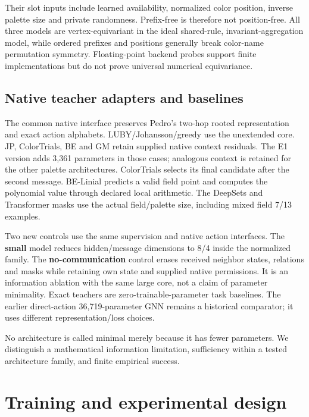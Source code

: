 \documentclass[
  11pt,
]{article}
\begin{document}
Their slot inputs include learned availability, normalized color
position, inverse palette size and private randomness. Prefix-free is
therefore not position-free. All three models are vertex-equivariant in
the ideal shared-rule, invariant-aggregation model, while ordered
prefixes and positions generally break color-name permutation symmetry.
Floating-point backend probes support finite implementations but do not
prove universal numerical equivariance.

\subsection{Native teacher adapters and
baselines}\label{native-teacher-adapters-and-baselines}

The common native interface preserves Pedro's two-hop rooted
representation and exact action alphabets. LUBY/Johansson/greedy use the
unextended core. JP, ColorTrials, BE and GM retain supplied native
context residuals. The E1 version adds 3,361 parameters in those cases;
analogous context is retained for the other palette architectures.
ColorTrials selects its final candidate after the second message.
BE-Linial predicts a valid field point and computes the polynomial value
through declared local arithmetic. The DeepSets and Transformer masks
use the actual field/palette size, including mixed field 7/13 examples.

Two new controls use the same supervision and native action interfaces.
The \textbf{small} model reduces hidden/message dimensions to 8/4 inside
the normalized family. The \textbf{no-communication} control erases
received neighbor states, relations and masks while retaining own state
and supplied native permissions. It is an information ablation with the
same large core, not a claim of parameter minimality. Exact teachers are
zero-trainable-parameter task baselines. The earlier direct-action
36,719-parameter GNN remains a historical comparator; it uses different
representation/loss choices.

No architecture is called minimal merely because it has fewer
parameters. We distinguish a mathematical information limitation,
sufficiency within a tested architecture family, and finite empirical
success.

\section{Training and experimental
design}\label{training-and-experimental-design}
\end{document}
